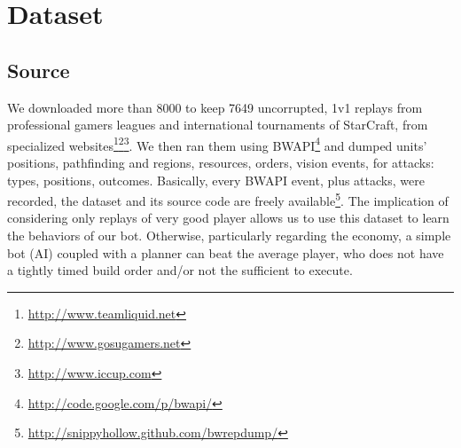 \section{Dataset}
\label{sec:dataset}
\subsection{Source}
We downloaded more than 8000  to keep 7649 uncorrupted, 1v1 replays from professional gamers leagues and international tournaments of StarCraft, from specialized websites\footnote{\url{http://www.teamliquid.net}}\footnote{\url{http://www.gosugamers.net}}\footnote{\url{http://www.iccup.com}}. We then ran them using BWAPI\footnote{\url{http://code.google.com/p/bwapi/}} and dumped units' positions, pathfinding and regions, resources, orders, vision events, for attacks: types, positions, outcomes. Basically, every BWAPI event, plus attacks, were recorded, the dataset and its source code are freely available\footnote{\url{http://snippyhollow.github.com/bwrepdump/}}. 
The implication of considering only replays of very good player allows us to use this dataset to learn the behaviors of our bot. Otherwise, particularly regarding the economy, a simple bot (AI) coupled with a planner can beat the average player, who does not have a tightly timed build order and/or not the sufficient  to execute. %


